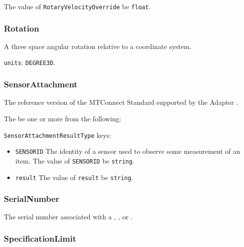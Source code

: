 The value of \texttt{RotaryVelocityOverride} \MUST be \texttt{float}.



\subsubsection{Rotation}
\label{sec:Rotation}



A three space angular rotation relative to a coordinate system.


\texttt{units}: \texttt{DEGREE\textunderscore 3D}.


\subsubsection{SensorAttachment}
\label{sec:SensorAttachment}



The reference version of the MTConnect Standard supported by the \gls{Adapter}
.


The   \MUST be one or more from the following:

\texttt{SensorAttachmentResultType} keys:

\begin{itemize}
\item \texttt{SENSOR\textunderscore ID} \newline The identity of a sensor used to observe some measurement of an item. 
\newline The value of \texttt{SENSOR\textunderscore ID} \MUST be \texttt{string}.

\item \texttt{result} \newline  
\newline The value of \texttt{result} \MUST be \texttt{string}.

\end{itemize}



\subsubsection{SerialNumber}
\label{sec:SerialNumber}



The serial number associated with a , , or .



\subsubsection{SpecificationLimit}
\label{sec:SpecificationLimit}



